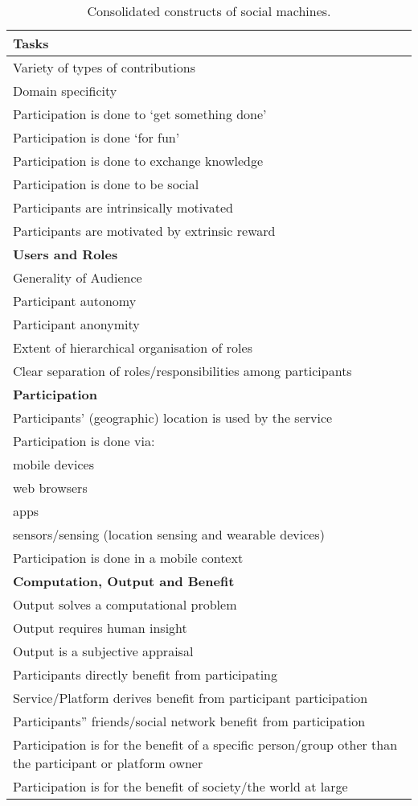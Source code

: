 
\begin{table}[htb]
\begin{center}
\begin{tabular}{|p{8cm}|}
\hline
{\bf Tasks} \\
\hline
Variety of types of contributions \\
Domain specificity \\
Participation is done to `get something done' \\
Participation is done `for fun' \\
Participation is done to exchange knowledge \\
Participation is done to be social \\
Participants are intrinsically motivated \\
Participants are motivated by extrinsic reward \\
\hline
{\bf Users and Roles} \\
\hline
Generality of Audience \\
Participant autonomy \\
Participant anonymity \\
Extent of hierarchical organisation of roles \\
Clear separation of roles/responsibilities among participants \\
\hline
{\bf Participation} \\
\hline
Participants' (geographic) location is used by the service \\
Participation is done via: \\
\hspace{1cm} mobile devices \\
\hspace{1cm} web browsers \\
\hspace{1cm} apps \\
\hspace{1cm} sensors/sensing (location sensing and wearable devices) \\
Participation is done in a mobile context \\
\hline
{\bf Computation, Output and Benefit} \\
\hline
Output solves a computational problem \\
Output requires human insight \\
Output is a subjective appraisal \\
Participants directly benefit from participating \\
Service/Platform derives benefit from participant participation \\
Participants'' friends/social network benefit from participation \\
Participation is for the benefit of a specific person/group other than the participant or platform owner \\
Participation is for the benefit of society/the world at large  \\
\hline
\end{tabular}
\end{center}
\caption{Consolidated constructs of social machines.} \label{table:constructs}
\end{table}
